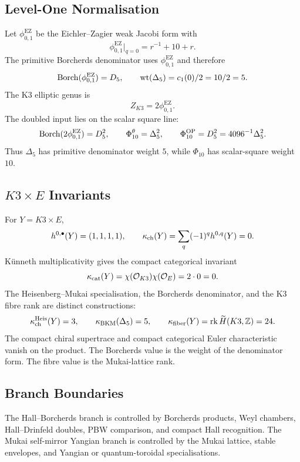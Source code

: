 \subsection*{Level-One Normalisation}

Let $\phi_{0,1}^{\mathrm{EZ}}$ be the Eichler--Zagier weak Jacobi form
with
\[
  \phi_{0,1}^{\mathrm{EZ}}|_{q=0}=r^{-1}+10+r.
\]
The primitive Borcherds denominator uses $\phi_{0,1}^{\mathrm{EZ}}$ and
therefore
\[
  \operatorname{Borch}(\phi_{0,1}^{\mathrm{EZ}})=D_5,
  \qquad
  \mathrm{wt}(\Delta_5)=c_1(0)/2=10/2=5.
\]
The K3 elliptic genus is
\[
  Z_{K3}=2\phi_{0,1}^{\mathrm{EZ}}.
\]
The doubled input lies on the scalar square line:
\[
  \operatorname{Borch}(2\phi_{0,1}^{\mathrm{EZ}})=D_5^2,\qquad
  \Phi_{10}^{\theta}=\Delta_5^2,\qquad
  \Phi_{10}^{\mathrm{OP}}=D_5^2=4096^{-1}\Delta_5^2.
\]
Thus $\Delta_5$ has primitive denominator weight $5$, while
$\Phi_{10}$ has scalar-square weight $10$.

\subsection*{\texorpdfstring{$K3\times E$}{K3 x E} Invariants}

For $Y=K3\times E$,
\[
  h^{0,\bullet}(Y)=(1,1,1,1),
  \qquad
  \kappa_{\mathrm{ch}}(Y)=\sum_q(-1)^q h^{0,q}(Y)=0.
\]
K\"unneth multiplicativity gives the compact categorical invariant
\[
  \kappa_{\mathrm{cat}}(Y)=\chi(\mathcal O_{K3})\chi(\mathcal O_E)=2\cdot0=0.
\]
The Heisenberg--Mukai specialisation, the Borcherds denominator, and the
K3 fibre rank are distinct constructions:
\[
  \kappa_{\mathrm{ch}}^{\mathrm{Heis}}(Y)=3,\qquad
  \kappa_{\mathrm{BKM}}(\Delta_5)=5,\qquad
  \kappa_{\mathrm{fiber}}(Y)=\operatorname{rk}\widetilde H(K3,\mathbb{Z})=24.
\]
The compact chiral supertrace and compact categorical Euler
characteristic vanish on the product. The Borcherds value is the weight
of the denominator form. The fibre value is the Mukai-lattice rank.

\subsection*{Branch Boundaries}

The Hall--Borcherds branch is controlled by Borcherds products, Weyl
chambers, Hall--Drinfeld doubles, PBW comparison, and compact Hall
recognition. The Mukai self-mirror Yangian branch is controlled by the
Mukai lattice, stable envelopes, and Yangian or quantum-toroidal
specialisations.

